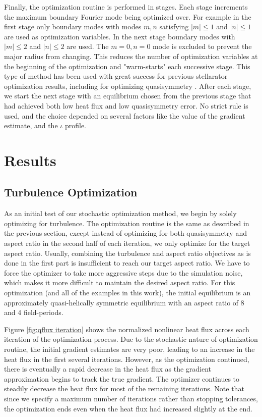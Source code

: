 \documentclass{jpp}
\begin{document}
Finally, the optimization routine is performed in stages. Each stage increments the maximum boundary Fourier mode being optimized over. For example in the first stage only boundary modes with modes $m,n$ satisfying $|m| \leq 1$ and $|n| \leq 1$ are used as optimization variables. In the next stage boundary modes with $|m| \leq 2$ and $|n| \leq 2$ are used. The $m=0,n=0$ mode is excluded to prevent the major radius from changing. This reduces the number of optimization variables at the beginning of the optimization and "warm-starts" each successive stage. This type of method has been used with great success for previous stellarator optimization results, including for optimizing quasisymmetry \citep{Landreman2022MagneticConfinement}. After each stage, we start the next stage with an equilibrium chosen from the previous stage that had achieved both low heat flux and low quasisymmetry error. No strict rule is used, and the choice depended on several factors like the value of the gradient estimate, and the $\iota$ profile.

\section{Results}\label{Results}
\subsection{Turbulence Optimization}\label{turbulence only opt}
As an initial test of our stochastic optimization method, we begin by solely optimizing for turbulence. The optimization routine is the same as described in the previous section, except instead of optimizing for both quasisymmetry and aspect ratio in the second half of each iteration, we only optimize for the target aspect ratio. Usually, combining the turbulence and aspect ratio objectives as is done in the first part is insufficient to reach our target aspect ratio. We have to force the optimizer to take more aggressive steps due to the simulation noise, which makes it more difficult to maintain the desired aspect ratio. For this optimization (and all of the examples in this work), the initial equilibrium is an approximately quasi-helically symmetric equilibrium with an aspect ratio of 8 and 4 field-periods.

Figure \ref{fig:qflux iteration} shows the normalized nonlinear heat flux across each iteration of the optimization process. Due to the stochastic nature of optimization routine, the initial gradient estimates are very poor, leading to an increase in the heat flux in the first several iterations. However, as the optimization continued, there is eventually a rapid decrease in the heat flux as the gradient approximation begins to track the true gradient. The optimizer continues to steadily decrease the heat flux for most of the remaining iterations. Note that since we specify a maximum number of iterations rather than stopping tolerances, the optimization ends even when the heat flux had increased slightly at the end.
\end{document}
